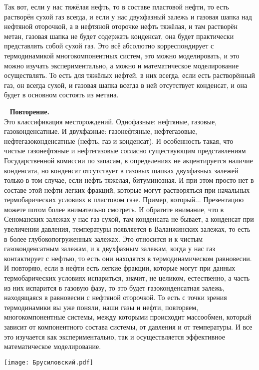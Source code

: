 \documentclass[main.tex]{subfiles}
\begin{document}
Так вот, если у нас тяжёлая нефть, то в составе пластовой нефти, то есть растворён сухой газ всегда, и если у нас двухфазный залежь и газовая шапка над нефтяной оторочкой, а в нефтяной оторочке нефть тяжёлая, и там растворён метан, газовая шапка не будет содержать конденсат, она будет практически представлять собой сухой газ.
Это всё абсолютно корреспондирует с термодинамикой многокомпонентных систем, это можно моделировать, и это можно изучать экспериментально, а можно и математическое моделирование осуществлять.
То есть для тяжёлых нефтей, в них всегда, если есть растворённый газ, он всегда сухой, и газовая шапка всегда в ней отсутствует конденсат, и она будет в основном состоять из метана.

\ \newline
\textbf{Повторение.}\\
Это классификация месторождений.
Однофазные: нефтяные, газовые, газоконденсатные.
И двухфазные: газонефтяные, нефтегазовые, нефтегазоконденсатные (нефть, газ и конденсат).
И особенность такая, что чистые газонефтяные и нефтегазовые согласно существующим представлениям Государственной комиссии по запасам, в определениях не акцентируется наличие конденсата, но конденсат отсутствует в газовых шапках двухфазных залежей только в том случае, если нефть тяжелая, битуминозная.
И при этом просто нет в составе этой нефти легких фракций, которые могут растворяться при начальных термобарических условиях в пластовом газе.
Пример, который... Презентацию можете потом более внимательно смотреть.
И обратите внимание, что в Сеноманских залежах у нас газ сухой, там конденсата не бывает, а конденсат при увеличении давления, температуры появляется в Валанжинских залежах, то есть в более глубокопогруженных залежах.
Это относится и к чистым газоконденсатным залежам, и к двухфазным залежам, когда у нас газ контактирует с нефтью, то есть они находятся в термодинамическом равновесии.
И повторяю, если в нефти есть легкие фракции, которые могут при данных термобарических условиях испариться, значит, не целиком, естественно, а часть из них испарится в газовую фазу, то это будет газоконденсатная залежь, находящаяся в равновесии с нефтяной оторочкой.
То есть с точки зрения термодинамики вы уже поняли, наши газы и нефти, повторяем, многокомпонентные системы, между которыми происходит массообмен, который зависит от компонентного состава системы, от давления и от температуры.
И все это изучается как экспериментально, так и осуществляется эффективное математическое моделирование.

\begin{center}
\texttt{[image: Брусиловский.pdf]}
\end{center}
\end{document}

